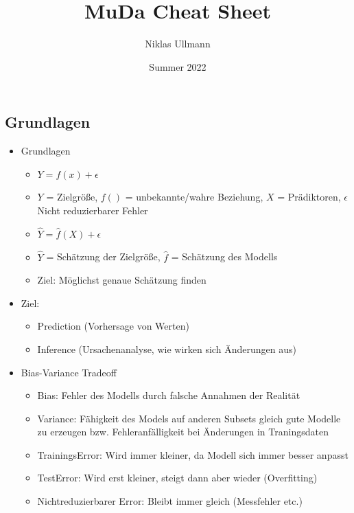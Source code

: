 \documentclass[a4paper]{article}
\title{MuDa Cheat Sheet}
\author{Niklas Ullmann}
\date{Summer 2022}
\begin{document}
\begin{landscape}
    \thispagestyle{empty}

    \begin{multicols}{3}
        \section{Grundlagen}
        \begin{itemize}[noitemsep,nolistsep,leftmargin=*]
            \item Grundlagen
            \begin{itemize}[noitemsep,nolistsep,leftmargin=*]
                \item\textbf{ $Y = f(x) + \epsilon$}
                \item $Y$ = Zielgröße, $f()$ = unbekannte/wahre Beziehung, $X$ = Prädiktoren, $\epsilon$ Nicht reduzierbarer Fehler
                \item \textbf{$\hat{Y} = \hat{f}(X)+\epsilon$}
                \item $\hat{Y}$ = Schätzung der Zielgröße, $\hat{f}$ = Schätzung des Modells
                \item Ziel: Möglichst genaue Schätzung finden
            \end{itemize}
            \item Ziel:
            \begin{itemize}[noitemsep,nolistsep,leftmargin=*]
                \item Prediction (Vorhersage von Werten)
                \item Inference (Ursachenanalyse, wie wirken sich Änderungen aus)
            \end{itemize}
            \item Bias-Variance Tradeoff
            \begin{itemize}[noitemsep,nolistsep,leftmargin=*]
                \item Bias: Fehler des Modells durch falsche Annahmen der Realität
                \item Variance: Fähigkeit des Models auf anderen Subsets gleich gute Modelle zu erzeugen bzw. Fehleranfälligkeit bei Änderungen in Traningsdaten
                \item TrainingsError: Wird immer kleiner, da Modell sich immer besser anpasst
                \item TestError: Wird erst kleiner, steigt dann aber wieder (Overfitting)
                \item Nichtreduzierbarer Error: Bleibt immer gleich (Messfehler etc.)

\end{itemize}
\end{itemize}
\end{multicols}
\end{landscape}
\end{document}
